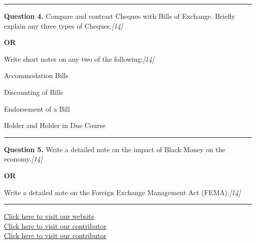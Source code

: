 \documentclass[11pt,a4paper]{article}
\newcommand{\pts}[1]{\hfill   \textit{[#1]}}
\begin{document}
\medskip\rule{\linewidth}{0.2pt}




\noindent   \textbf{Question 4.}
Compare and contrast Cheques with Bills of Exchange. Briefly explain any three types of Cheques.\pts{14}

\centerline{   \textbf{OR}}

Write short notes on any two of the following:\pts{14}

\begin{parts}
  \item Accommodation Bills
  \item Discounting of Bills
  \item Endorsement of a Bill
  \item Holder and Holder in Due Course
\end{parts}

\medskip\rule{\linewidth}{0.2pt}




\noindent   \textbf{Question 5.}
Write a detailed note on the impact of Black Money on the economy.\pts{14}

\centerline{   \textbf{OR}}

Write a detailed note on the Foreign Exchange Management Act (FEMA).\pts{14}

\vfill
\rule{\linewidth}{0.4pt}

\begin{center}\small
\href{https://bhu-exam.vercel.app/}{Click here to visit our website}\\[4pt]
\href{https://me-aryan.vercel.app/}{Click here to visit our contributor}\\[4pt]
\href{https://quashan-me.vercel.app/}{Click here to visit our contributor}
\end{center}
\end{document}
